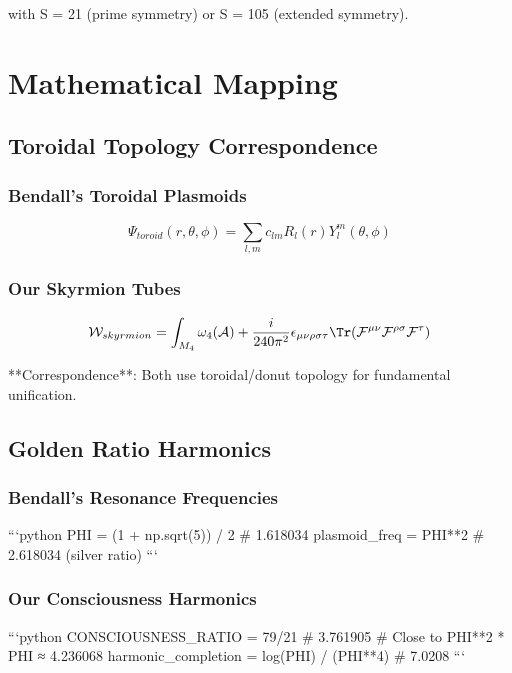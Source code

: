\documentclass[12pt]{article}
\begin{document}
with S = 21 (prime symmetry) or S = 105 (extended symmetry).

\section{Mathematical Mapping}

\subsection{Toroidal Topology Correspondence}

\subsubsection{Bendall's Toroidal Plasmoids}
\begin{equation}
\Psi_{toroid}(r,\theta,\phi) = \sum_{l,m} c_{lm} R_l(r) Y_l^m(\theta,\phi)
\end{equation}

\subsubsection{Our Skyrmion Tubes}
\begin{equation}
\mathcal{W}_{skyrmion} = \int_{M_4} \omega_4(\mathcal{A}) + \frac{i}{240\pi^2} \epsilon_{\mu\nu\rho\sigma\tau} \Tr(\mathcal{F}^{\mu\nu}\mathcal{F}^{\rho\sigma}\mathcal{F}^{\tau})
\end{equation}

**Correspondence**: Both use toroidal/donut topology for fundamental unification.

\subsection{Golden Ratio Harmonics}

\subsubsection{Bendall's Resonance Frequencies}
```python
PHI = (1 + np.sqrt(5)) / 2  # 1.618034
plasmoid_freq = PHI**2      # 2.618034 (silver ratio)
```

\subsubsection{Our Consciousness Harmonics}
```python
CONSCIOUSNESS_RATIO = 79/21  # 3.761905
# Close to PHI**2 * PHI ≈ 4.236068
harmonic_completion = log(PHI) / (PHI**4)  # 7.0208%
```
\end{document}
